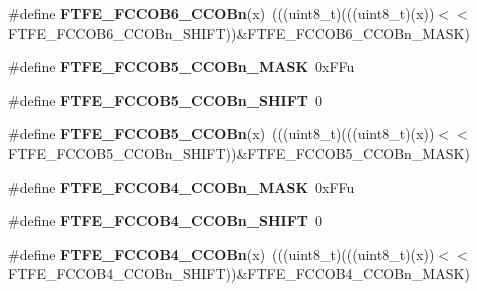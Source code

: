 \begin{DoxyCompactItemize}
\item 
\#define {\bfseries F\+T\+F\+E\+\_\+\+F\+C\+C\+O\+B6\+\_\+\+C\+C\+O\+Bn}(x)~(((uint8\+\_\+t)(((uint8\+\_\+t)(x))$<$$<$F\+T\+F\+E\+\_\+\+F\+C\+C\+O\+B6\+\_\+\+C\+C\+O\+Bn\+\_\+\+S\+H\+I\+FT))\&F\+T\+F\+E\+\_\+\+F\+C\+C\+O\+B6\+\_\+\+C\+C\+O\+Bn\+\_\+\+M\+A\+SK)\hypertarget{group__FTFE__Register__Masks_gaea3983b4c268847e9faa7badeb8096ef}{}\label{group__FTFE__Register__Masks_gaea3983b4c268847e9faa7badeb8096ef}

\item 
\#define {\bfseries F\+T\+F\+E\+\_\+\+F\+C\+C\+O\+B5\+\_\+\+C\+C\+O\+Bn\+\_\+\+M\+A\+SK}~0x\+F\+Fu\hypertarget{group__FTFE__Register__Masks_ga1fed27b766792ecc82407cbddb36d6f8}{}\label{group__FTFE__Register__Masks_ga1fed27b766792ecc82407cbddb36d6f8}

\item 
\#define {\bfseries F\+T\+F\+E\+\_\+\+F\+C\+C\+O\+B5\+\_\+\+C\+C\+O\+Bn\+\_\+\+S\+H\+I\+FT}~0\hypertarget{group__FTFE__Register__Masks_gaec76e9576208928867d1f819be0a8c66}{}\label{group__FTFE__Register__Masks_gaec76e9576208928867d1f819be0a8c66}

\item 
\#define {\bfseries F\+T\+F\+E\+\_\+\+F\+C\+C\+O\+B5\+\_\+\+C\+C\+O\+Bn}(x)~(((uint8\+\_\+t)(((uint8\+\_\+t)(x))$<$$<$F\+T\+F\+E\+\_\+\+F\+C\+C\+O\+B5\+\_\+\+C\+C\+O\+Bn\+\_\+\+S\+H\+I\+FT))\&F\+T\+F\+E\+\_\+\+F\+C\+C\+O\+B5\+\_\+\+C\+C\+O\+Bn\+\_\+\+M\+A\+SK)\hypertarget{group__FTFE__Register__Masks_ga3e61570eff41ab6f16727520d6de2750}{}\label{group__FTFE__Register__Masks_ga3e61570eff41ab6f16727520d6de2750}

\item 
\#define {\bfseries F\+T\+F\+E\+\_\+\+F\+C\+C\+O\+B4\+\_\+\+C\+C\+O\+Bn\+\_\+\+M\+A\+SK}~0x\+F\+Fu\hypertarget{group__FTFE__Register__Masks_gad17f10cdfff46d245fa4c9511a45e205}{}\label{group__FTFE__Register__Masks_gad17f10cdfff46d245fa4c9511a45e205}

\item 
\#define {\bfseries F\+T\+F\+E\+\_\+\+F\+C\+C\+O\+B4\+\_\+\+C\+C\+O\+Bn\+\_\+\+S\+H\+I\+FT}~0\hypertarget{group__FTFE__Register__Masks_ga83b627db8362dc2297b26ecbf2cae0a6}{}\label{group__FTFE__Register__Masks_ga83b627db8362dc2297b26ecbf2cae0a6}

\item 
\#define {\bfseries F\+T\+F\+E\+\_\+\+F\+C\+C\+O\+B4\+\_\+\+C\+C\+O\+Bn}(x)~(((uint8\+\_\+t)(((uint8\+\_\+t)(x))$<$$<$F\+T\+F\+E\+\_\+\+F\+C\+C\+O\+B4\+\_\+\+C\+C\+O\+Bn\+\_\+\+S\+H\+I\+FT))\&F\+T\+F\+E\+\_\+\+F\+C\+C\+O\+B4\+\_\+\+C\+C\+O\+Bn\+\_\+\+M\+A\+SK)\hypertarget{group__FTFE__Register__Masks_gabce401f12c6def3ea6a54f3b879e51ed}{}\label{group__FTFE__Register__Masks_gabce401f12c6def3ea6a54f3b879e51ed}


\end{DoxyCompactItemize}
